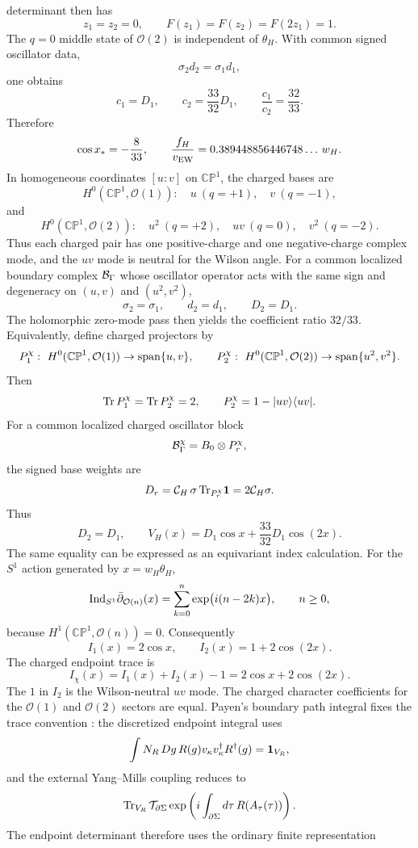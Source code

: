 \documentclass[11pt]{article}
\theoremstyle{definition}
\theoremstyle{remark}
\newcommand{\CP}{\mathbb{CP}}
\newcommand{\cO}{\mathcal O}
\begin{document}
determinant then has
\[
  z_1=z_2=0,
  \qquad F(z_1)=F(z_2)=F(2z_1)=1.
\]
The \(q=0\) middle state of \(\cO(2)\) is independent of \(\theta_H\).  With
common signed oscillator data,
\[
  \sigma_2d_2=\sigma_1d_1,
\]
one obtains
\[
  c_1=D_1,\qquad c_2=\frac{33}{32}D_1,
  \qquad
  \frac{c_1}{c_2}=\frac{32}{33}.
\]
Therefore
\[
  \cos x_*=-\frac{8}{33},
  \qquad
  \frac{f_H}{v_{\rm EW}}=
  0.389448856446748\ldots\,w_H .
\]
In homogeneous coordinates \([u:v]\) on \(\CP^1\), the charged bases are
\[
  H^0(\CP^1,\cO(1)):
  \quad u\ (q=+1),\quad v\ (q=-1),
\]
and
\[
  H^0(\CP^1,\cO(2)):
  \quad u^2\ (q=+2),\quad uv\ (q=0),\quad v^2\ (q=-2).
\]
Thus each charged pair has one positive-charge and one negative-charge complex
mode, and the \(uv\) mode is neutral for the Wilson angle.  For a common
localized boundary complex \({\cal B}_\Gamma\) whose oscillator operator acts
with the same sign and degeneracy on \((u,v)\) and \((u^2,v^2)\),
\[
  \sigma_2=\sigma_1,\qquad d_2=d_1,\qquad D_2=D_1.
\]
The holomorphic zero-mode pass then yields the coefficient ratio \(32/33\).
Equivalently, define charged projectors by
\[
  P_1^\chi:\ H^0(\CP^1,\cO(1))\to{\rm span}\{u,v\},
  \qquad
  P_2^\chi:\ H^0(\CP^1,\cO(2))\to{\rm span}\{u^2,v^2\}.
\]
Then
\[
  {\rm Tr}\,P_1^\chi={\rm Tr}\,P_2^\chi=2,
  \qquad
  P_2^\chi=1-|uv\rangle\langle uv|.
\]
For a common localized charged oscillator block
\[
  {\cal B}_\Gamma^\chi=B_0\otimes P_r^\chi,
\]
the signed base weights are
\[
  D_r={\cal C}_H\,\sigma\,{\rm Tr}_{P_r^\chi}{\bf 1}
  =
  2{\cal C}_H\sigma .
\]
Thus
\[
  D_2=D_1,
  \qquad
  V_H(x)=D_1\cos x+\frac{33}{32}D_1\cos(2x).
\]
The same equality can be expressed as an equivariant index calculation.  For
the \(S^1\) action generated by \(x=w_H\theta_H\),
\[
  {\rm Ind}_{S^1}\bar\partial_{\cO(n)}(x)
  =
  \sum_{k=0}^{n}\exp\!\big(i(n-2k)x\big),
  \qquad n\ge0,
\]
because \(H^1(\CP^1,\cO(n))=0\).  Consequently
\[
  I_1(x)=2\cos x,
  \qquad
  I_2(x)=1+2\cos(2x).
\]
The charged endpoint trace is
\[
  I_\chi(x)=I_1(x)+I_2(x)-1
  =
  2\cos x+2\cos(2x).
\]
The \(1\) in \(I_2\) is the Wilson-neutral \(uv\) mode.  The charged
character coefficients for the \(\cO(1)\) and \(\cO(2)\) sectors are equal.
Payen's boundary path integral fixes the trace convention
\cite{Payen2007}: the discretized endpoint integral uses
\[
  \int N_R\,Dg\,R(g)v_\kappa v_\kappa^\dagger R^\dagger(g)
  =
  {\bf 1}_{V_R},
\]
and the external Yang--Mills coupling reduces to
\[
  {\rm Tr}_{V_R}\,
  {\cal T}_{\partial\Sigma}
  \exp\left(
    i\int_{\partial\Sigma}d\tau\,R(A_\tau(\tau))
  \right).
\]
The endpoint determinant therefore uses the ordinary finite representation
\end{document}
